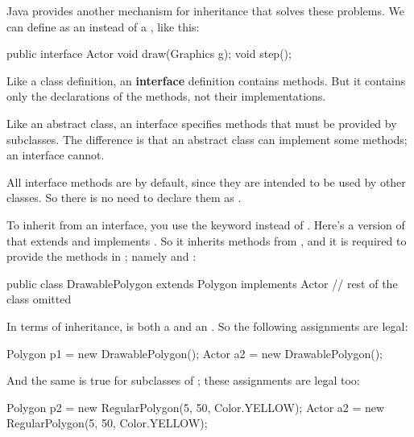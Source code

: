 
Java provides another mechanism for inheritance that solves these problems.
We can define  as an  instead of a , like this:

\begin{code}
public interface Actor {
    void draw(Graphics g);
    void step();
}
\end{code}


Like a class definition, an {\bf interface} definition contains methods.
But it contains only the declarations of the methods, not their implementations.

Like an abstract class, an interface specifies methods that must be provided by subclasses.
The difference is that an abstract class can implement some methods; an interface cannot.

All interface methods are  by default, since they are intended to be used by other classes.
So there is no need to declare them as .

To inherit from an interface, you use the keyword  instead of .
Here's a version of  that extends  and implements .
So it inherits methods from , and it is required to provide the methods in ; namely  and :

\begin{code}
public class DrawablePolygon extends Polygon implements Actor {
    // rest of the class omitted
}
\end{code}

In terms of inheritance,  is both a  and an .
So the following assignments are legal:

\begin{code}
Polygon p1 = new DrawablePolygon();
Actor a2 = new DrawablePolygon();
\end{code}

And the same is true for subclasses of ; these assignments are legal too:

\begin{code}
Polygon p2 = new RegularPolygon(5, 50, Color.YELLOW);
Actor a2 = new RegularPolygon(5, 50, Color.YELLOW);
\end{code}


